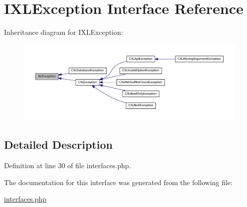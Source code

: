 \hypertarget{interfaceIXLException}{
\section{IXLException Interface Reference}
\label{interfaceIXLException}
}


Inheritance diagram for IXLException:\nopagebreak
\begin{figure}[H]
\begin{center}
\leavevmode
\includegraphics[width=400pt]{interfaceIXLException__inherit__graph}
\end{center}
\end{figure}


\subsection{Detailed Description}


Definition at line 30 of file interfaces.php.



The documentation for this interface was generated from the following file:\begin{DoxyCompactItemize}
\item 
\hyperlink{interfaces_8php}{interfaces.php}\end{DoxyCompactItemize}
